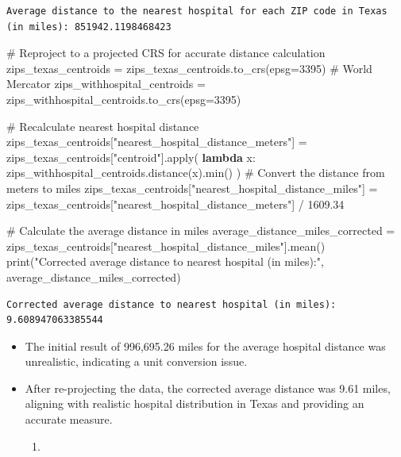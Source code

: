 \documentclass[
  letterpaper,
  DIV=11,
  numbers=noendperiod]{scrartcl}
\newenvironment{Shaded}{\begin{snugshade}}{\end{snugshade}}
\newcommand{\BuiltInTok}[1]{\textcolor[rgb]{0.00,0.23,0.31}{#1}}
\newcommand{\CommentTok}[1]{\textcolor[rgb]{0.37,0.37,0.37}{#1}}
\newcommand{\DecValTok}[1]{\textcolor[rgb]{0.68,0.00,0.00}{#1}}
\newcommand{\FloatTok}[1]{\textcolor[rgb]{0.68,0.00,0.00}{#1}}
\newcommand{\KeywordTok}[1]{\textcolor[rgb]{0.00,0.23,0.31}{\textbf{#1}}}
\newcommand{\NormalTok}[1]{\textcolor[rgb]{0.00,0.23,0.31}{#1}}
\newcommand{\OperatorTok}[1]{\textcolor[rgb]{0.37,0.37,0.37}{#1}}
\newcommand{\StringTok}[1]{\textcolor[rgb]{0.13,0.47,0.30}{#1}}
\providecommand{\tightlist}{%
  \setlength{\itemsep}{0pt}\setlength{\parskip}{0pt}}\usepackage{longtable,booktabs,array}
\begin{document}
\begin{verbatim}
Average distance to the nearest hospital for each ZIP code in Texas (in miles): 851942.1198468423
\end{verbatim}

\begin{Shaded}
\begin{Highlighting}[]
\CommentTok{\# Reproject to a projected CRS for accurate distance calculation}
\NormalTok{zips\_texas\_centroids }\OperatorTok{=}\NormalTok{ zips\_texas\_centroids.to\_crs(epsg}\OperatorTok{=}\DecValTok{3395}\NormalTok{)  }\CommentTok{\# World Mercator}
\NormalTok{zips\_withhospital\_centroids }\OperatorTok{=}\NormalTok{ zips\_withhospital\_centroids.to\_crs(epsg}\OperatorTok{=}\DecValTok{3395}\NormalTok{)}

\CommentTok{\# Recalculate nearest hospital distance}
\NormalTok{zips\_texas\_centroids[}\StringTok{"nearest\_hospital\_distance\_meters"}\NormalTok{] }\OperatorTok{=}\NormalTok{ zips\_texas\_centroids[}\StringTok{"centroid"}\NormalTok{].}\BuiltInTok{apply}\NormalTok{(}
    \KeywordTok{lambda}\NormalTok{ x: zips\_withhospital\_centroids.distance(x).}\BuiltInTok{min}\NormalTok{()}
\NormalTok{)}
\CommentTok{\# Convert the distance from meters to miles}
\NormalTok{zips\_texas\_centroids[}\StringTok{"nearest\_hospital\_distance\_miles"}\NormalTok{] }\OperatorTok{=}\NormalTok{ zips\_texas\_centroids[}\StringTok{"nearest\_hospital\_distance\_meters"}\NormalTok{] }\OperatorTok{/} \FloatTok{1609.34}

\CommentTok{\# Calculate the average distance in miles}
\NormalTok{average\_distance\_miles\_corrected }\OperatorTok{=}\NormalTok{ zips\_texas\_centroids[}\StringTok{"nearest\_hospital\_distance\_miles"}\NormalTok{].mean()}
\BuiltInTok{print}\NormalTok{(}\StringTok{"Corrected average distance to nearest hospital (in miles):"}\NormalTok{, average\_distance\_miles\_corrected)}
\end{Highlighting}
\end{Shaded}

\begin{verbatim}
Corrected average distance to nearest hospital (in miles): 9.608947063385544
\end{verbatim}

\begin{itemize}
\item
  The initial result of 996,695.26 miles for the average hospital
  distance was unrealistic, indicating a unit conversion issue.
\item
  After re-projecting the data, the corrected average distance was 9.61
  miles, aligning with realistic hospital distribution in Texas and
  providing an accurate measure.

  \begin{enumerate}
  \def\labelenumi{\alph{enumi}.}
  \setcounter{enumi}{2}
  \tightlist
  \item
  \end{enumerate}
\end{itemize}
\end{document}
